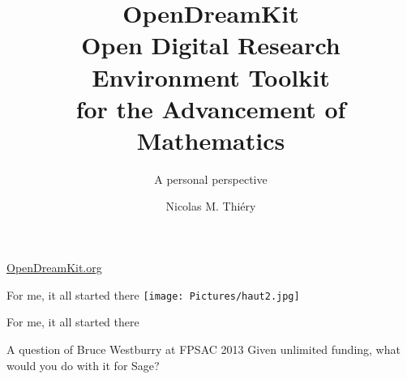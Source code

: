 \documentclass[
  usenames,svgnames, %
  compress,
  ]{beamer}
\title{{\huge \color{red} OpenDreamKit}\\
  Open Digital Research Environment Toolkit\\
  for the Advancement of Mathematics\\}
\subtitle{A personal perspective}
\begin{document}
\author{Nicolas M. Thiéry}
\begin{frame}
  \maketitle

  \Huge
  \centerline{\url{OpenDreamKit.org}}
\end{frame}

\begin{frame}{For me, it all started there}
  \texttt{[image: Pictures/haut2.jpg]}
\end{frame}

%
%



\begin{frame}{For me, it all started there}

  \begin{block}{A question of Bruce Westburry at FPSAC 2013}
    Given unlimited funding, what would you do with it for Sage?
  \end{block}

\end{frame}
\end{document}
